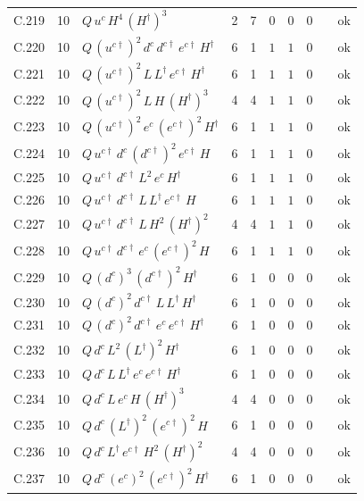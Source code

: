 {\begin{longtable}{@{}ll>{\raggedright\arraybackslash}p{6.4cm}rrllllr@{}}
C.219 & 10 & $Q\,u^c\,H^{4}\,(H^\dagger)^{3}$ & 2 & 7 & $0$ & $0$ & $0$ &  & ok \\
C.220 & 10 & $Q\,(u^{c\dagger})^{2}\,d^c\,d^{c\dagger}\,e^{c\dagger}\,H^\dagger$ & 6 & 1 & $1$ & $1$ & $0$ &  & ok \\
C.221 & 10 & $Q\,(u^{c\dagger})^{2}\,L\,L^\dagger\,e^{c\dagger}\,H^\dagger$ & 6 & 1 & $1$ & $1$ & $0$ &  & ok \\
C.222 & 10 & $Q\,(u^{c\dagger})^{2}\,L\,H\,(H^\dagger)^{3}$ & 4 & 4 & $1$ & $1$ & $0$ &  & ok \\
C.223 & 10 & $Q\,(u^{c\dagger})^{2}\,e^c\,(e^{c\dagger})^{2}\,H^\dagger$ & 6 & 1 & $1$ & $1$ & $0$ &  & ok \\
C.224 & 10 & $Q\,u^{c\dagger}\,d^c\,(d^{c\dagger})^{2}\,e^{c\dagger}\,H$ & 6 & 1 & $1$ & $1$ & $0$ &  & ok \\
C.225 & 10 & $Q\,u^{c\dagger}\,d^{c\dagger}\,L^{2}\,e^c\,H^\dagger$ & 6 & 1 & $1$ & $1$ & $0$ &  & ok \\
C.226 & 10 & $Q\,u^{c\dagger}\,d^{c\dagger}\,L\,L^\dagger\,e^{c\dagger}\,H$ & 6 & 1 & $1$ & $1$ & $0$ &  & ok \\
C.227 & 10 & $Q\,u^{c\dagger}\,d^{c\dagger}\,L\,H^{2}\,(H^\dagger)^{2}$ & 4 & 4 & $1$ & $1$ & $0$ &  & ok \\
C.228 & 10 & $Q\,u^{c\dagger}\,d^{c\dagger}\,e^c\,(e^{c\dagger})^{2}\,H$ & 6 & 1 & $1$ & $1$ & $0$ &  & ok \\
C.229 & 10 & $Q\,(d^c)^{3}\,(d^{c\dagger})^{2}\,H^\dagger$ & 6 & 1 & $0$ & $0$ & $0$ &  & ok \\
C.230 & 10 & $Q\,(d^c)^{2}\,d^{c\dagger}\,L\,L^\dagger\,H^\dagger$ & 6 & 1 & $0$ & $0$ & $0$ &  & ok \\
C.231 & 10 & $Q\,(d^c)^{2}\,d^{c\dagger}\,e^c\,e^{c\dagger}\,H^\dagger$ & 6 & 1 & $0$ & $0$ & $0$ &  & ok \\
C.232 & 10 & $Q\,d^c\,L^{2}\,(L^\dagger)^{2}\,H^\dagger$ & 6 & 1 & $0$ & $0$ & $0$ &  & ok \\
C.233 & 10 & $Q\,d^c\,L\,L^\dagger\,e^c\,e^{c\dagger}\,H^\dagger$ & 6 & 1 & $0$ & $0$ & $0$ &  & ok \\
C.234 & 10 & $Q\,d^c\,L\,e^c\,H\,(H^\dagger)^{3}$ & 4 & 4 & $0$ & $0$ & $0$ &  & ok \\
C.235 & 10 & $Q\,d^c\,(L^\dagger)^{2}\,(e^{c\dagger})^{2}\,H$ & 6 & 1 & $0$ & $0$ & $0$ &  & ok \\
C.236 & 10 & $Q\,d^c\,L^\dagger\,e^{c\dagger}\,H^{2}\,(H^\dagger)^{2}$ & 4 & 4 & $0$ & $0$ & $0$ &  & ok \\
C.237 & 10 & $Q\,d^c\,(e^c)^{2}\,(e^{c\dagger})^{2}\,H^\dagger$ & 6 & 1 & $0$ & $0$ & $0$ &  & ok \\

\end{longtable}}
